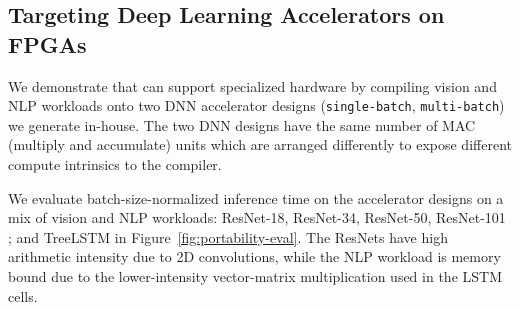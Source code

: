 \subsection*{Targeting Deep Learning Accelerators on FPGAs}
We demonstrate that \relay can support specialized hardware by compiling vision and
NLP workloads onto two DNN accelerator designs (\texttt{single-batch}, \texttt{multi-batch}) we generate in-house.
%
%
%
The two DNN designs have the same number of MAC (multiply and accumulate) units which are
arranged differently to expose different compute intrinsics to the compiler.
%
%

We evaluate batch-size-normalized inference time on the accelerator designs
  on a mix of vision and NLP workloads:
  ResNet-18, ResNet-34, ResNet-50, ResNet-101 \citep{resnet};
  and TreeLSTM in Figure~\ref{fig:portability-eval}.
The ResNets have high arithmetic intensity
due to 2D convolutions, while the NLP workload is memory bound due to the lower-intensity vector-matrix
multiplication used in the LSTM cells.

